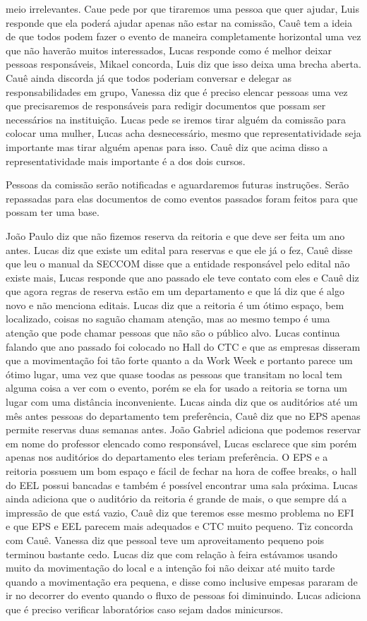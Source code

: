 \documentclass{ata-calico}
\begin{document}
meio irrelevantes. Caue pede por que tiraremos uma pessoa que quer ajudar, Luis
responde que ela poderá ajudar apenas não estar na comissão, Cauê tem a ideia
de que todos podem fazer o evento de maneira completamente horizontal uma vez
que não haverão muitos interessados, Lucas responde como é melhor deixar
pessoas responsáveis, Mikael concorda, Luis diz que isso deixa uma brecha
aberta. Cauê ainda discorda já que todos poderiam conversar e delegar as
responsabilidades em grupo, Vanessa diz que é preciso elencar pessoas uma vez
que precisaremos de responsáveis para redigir documentos que possam ser
necessários na instituição. Lucas pede se iremos tirar alguém da comissão para
colocar uma mulher, Lucas acha desnecessário, mesmo que representatividade seja
importante mas tirar alguém apenas para isso. Cauê diz que acima disso a
representatividade mais importante é a dos dois cursos.

Pessoas da comissão serão notificadas e aguardaremos futuras instruções. Serão
repassadas para elas documentos de como eventos passados foram feitos para que
possam ter uma base.

 João Paulo diz que não fizemos reserva da
reitoria e que deve ser feita um ano antes. Lucas diz que existe um edital para
reservas e que ele já o fez, Cauê disse que leu o manual da SECCOM disse que a
entidade responsável pelo edital não existe mais, Lucas responde que ano
passado ele teve contato com eles e Cauê diz que agora regras de reserva estão
em um departamento e que lá diz que é algo novo e não menciona editais. Lucas
diz que a reitoria é um ótimo espaço, bem localizado, coisas no saguão chamam
atenção, mas ao mesmo tempo é uma atenção que pode chamar pessoas que não são o
público alvo. Lucas continua falando que ano passado foi colocado no Hall do
CTC e que as empresas disseram que a movimentação foi tão forte quanto a da
Work Week e portanto parece um ótimo lugar, uma vez que quase toodas as pessoas
que transitam no local tem alguma coisa a ver com o evento, porém se ela for
usado a reitoria se torna um lugar com uma distância inconveniente. Lucas ainda
diz que os auditórios até um mês antes pessoas do departamento tem preferência,
Cauê diz que no EPS apenas permite reservas duas semanas antes. João Gabriel
adiciona que podemos reservar em nome do professor elencado como responsável,
Lucas esclarece que sim porém apenas nos auditórios do departamento eles teriam
preferência. O EPS e a reitoria possuem um bom espaço e fácil de fechar na hora
de coffee breaks, o hall do EEL possui bancadas e também é possível encontrar
uma sala próxima.  Lucas ainda adiciona que o auditório da reitoria é grande de
mais, o que sempre dá a impressão de que está vazio, Cauê diz que teremos esse
mesmo problema no EFI e que EPS e EEL parecem mais adequados e CTC muito
pequeno. Tiz concorda com Cauê. Vanessa diz que pessoal teve um aproveitamento
pequeno pois terminou bastante cedo. Lucas diz que com relação à feira
estávamos usando muito da movimentação do local e a intenção foi não deixar até
muito tarde quando a movimentação era pequena, e disse como inclusive empesas
pararam de ir no decorrer do evento quando o fluxo de pessoas foi diminuindo.
Lucas adiciona que é preciso verificar laboratórios caso sejam dados
minicursos.
\end{document}
